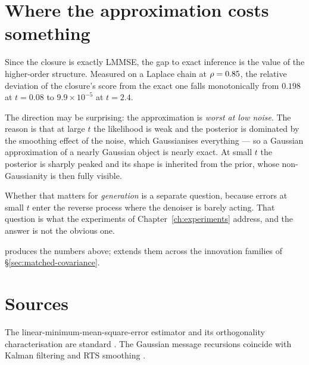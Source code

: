 \section{Where the approximation costs something}

Since the closure is exactly LMMSE, the gap to exact inference is the value of the
higher-order structure. Measured on a Laplace chain at $\rho=0.85$, the relative deviation of
the closure's score from the exact one falls monotonically from $0.198$ at $t=0.08$ to
$9.9\times10^{-5}$ at $t=2.4$.

\begin{intuition}
The direction may be surprising: the approximation is \emph{worst at low noise}. The reason is
that at large $t$ the likelihood is weak and the posterior is dominated by the smoothing effect
of the noise, which Gaussianises everything --- so a Gaussian approximation of a nearly Gaussian
object is nearly exact. At small $t$ the posterior is sharply peaked and its shape is inherited
from the prior, whose non-Gaussianity is then fully visible.

Whether that matters for \emph{generation} is a separate question, because errors at small $t$
enter the reverse process where the denoiser is barely acting. That question is what the
experiments of Chapter~\ref{ch:experiments} address, and the answer is not the obvious one.
\end{intuition}

\begin{codebox}
 produces the numbers
above;  extends them across
the innovation families of \S\ref{sec:matched-covariance}.
\end{codebox}

\section*{Sources}
The linear-minimum-mean-square-error estimator and its orthogonality characterisation are
standard \citep{kay1993,lehmann1998}. The Gaussian message recursions coincide with Kalman
filtering and RTS smoothing \citep{kalman1960,rauch1965}.
